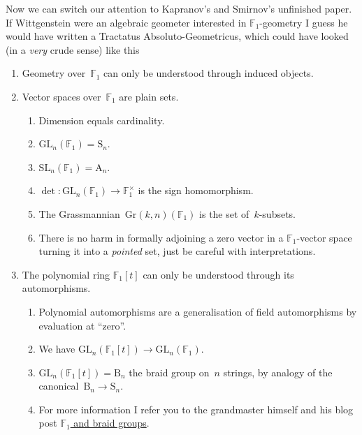 Now we can switch our attention to \iftex\cite{kapranov-smirnov}\fi\ifblog Kapranov's and Smirnov's unfinished paper\fi. If Wittgenstein were an algebraic geometer interested in $\mathbb{F}_1$-geometry I guess he would have written a Tractatus Absoluto-Geometricus, which could have looked (in a \emph{very} crude sense) like this
\begin{enumerate}
  \item Geometry over~$\mathbb{F}_1$ can only be understood through induced objects.
    \item Vector spaces over~$\mathbb{F}_1$ are plain sets.
      \begin{enumerate}
        \item Dimension equals cardinality.
        \item $\mathrm{GL}_n(\mathbb{F}_1)=\mathrm{S}_n$.
        \item $\mathrm{SL}_n(\mathbb{F}_1)=\mathrm{A}_n$.
        \item $\det\colon\mathrm{GL}_n(\mathbb{F}_1)\to\mathbb{F}_1^\times$ is the sign homomorphism.
        \item The Grassmannian~$\mathrm{Gr}(k,n)(\mathbb{F}_1)$ is the set of~$k$-subsets.
        \item There is no harm in formally adjoining a zero vector in a $\mathbb{F}_1$-vector space turning it into a \emph{pointed} set, just be careful with interpretations.
      \end{enumerate}

    \item The polynomial ring $\mathbb{F}_1[t]$ can only be understood through its automorphisms.
      \begin{enumerate}
        \item Polynomial automorphisms are a generalisation of field automorphisms by evaluation at ``zero''.
        \item We have $\mathrm{GL}_n(\mathbb{F}_1[t])\to\mathrm{GL}_n(\mathbb{F}_1)$.
        \item $\mathrm{GL}_n(\mathbb{F}_1[t])=\mathrm{B}_n$ the braid group on~$n$ strings, by analogy of the canonical~$\mathrm{B}_n\to\mathrm{S}_n$.
        \item For more information I refer you to the grandmaster himself and his blog post \href{http://www.neverendingbooks.org/index.php/f_un-and-braid-groups.html}{$\mathbb{F}_1$ and braid groups}.
      \end{enumerate}


\end{enumerate}
